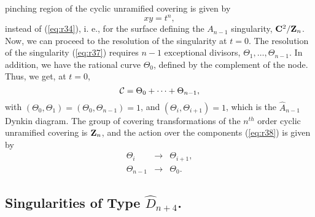 pinching region of the cyclic unramified covering is given by
\begin{equation}
xy=t^n,
\label{eq:r37}
\end{equation}
instead of (\ref{eq:r34}), i. e., for the surface defining the $A_{n-1}$ 
singularity, ${\bf C}^2/{\bf Z}_n$. Now, we can proceed to the resolution 
of the singularity at $t=0$. The resolution of the singularity (\ref{eq:r37}) 
requires $n-1$ exceptional divisors, $\Theta_1, \ldots, \Theta_{n-1}$. In 
addition, we have the rational curve $\Theta_0$, defined by the complement 
of the node. Thus, we get, at $t=0$,
\begin{equation}
{\cal C} =\Theta_0 + \cdots + \Theta_{n-1},
\label{eq:r38}
\end{equation}
with $(\Theta_0,\Theta_1)=(\Theta_0,\Theta_{n-1})=1$, and $(\Theta_i,
\Theta_{i+1})=1$, which is the $\hat{A}_{n-1}$ Dynkin diagram. The group 
of covering transformations of the $n^{th}$ order cyclic unramified 
covering is ${\bf Z}_n$, and the action over the components (\ref{eq:r38}) 
is given by
\begin{eqnarray}
\Theta_i & \rightarrow & \Theta_{i+1}, \nonumber \\
\Theta_{n-1} & \rightarrow & \Theta_0.
\label{eq:r39}
\end{eqnarray}

\subsection{Singularities of Type $\hat{D}_{n+4}$.}

